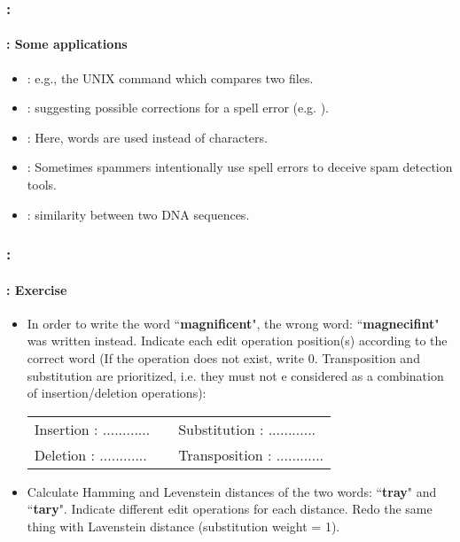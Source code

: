 \documentclass[xcolor=table]{beamer}
\begin{document}
\begin{frame}
	\frametitle{\insertshortsubtitle: \insertsection}
	\framesubtitle{\insertsubsection: Some applications}

	\begin{itemize}
		\item {}: e.g., the UNIX  command which compares two files.
		\item {}: suggesting possible corrections for a spell error (e.g. ).
		\item {}: Here, words are used instead of characters.
		\item {}: Sometimes spammers intentionally use spell errors to deceive spam detection tools.
		\item {}: similarity between two DNA sequences.
	\end{itemize}

\end{frame}

\begin{frame}
	\frametitle{\insertshortsubtitle: \insertsection}
	\framesubtitle{\insertsubsection: Exercise}
	
	\begin{itemize}
		\item In order to write the word ``\textbf{magnificent}", the wrong word: ``\textbf{magnecifint}" was written instead. Indicate each edit operation position(s) according to the correct word (If the operation does not exist, write 0. Transposition and substitution are prioritized, i.e. they must not e considered as a combination of insertion/deletion operations):
		\begin{tabular}{|lll|}
			\hline 
			Insertion : ............ & & Substitution  : ............ \\
			Deletion  : ............ & & Transposition : ............ \\
			\hline
		\end{tabular}
		
		\item Calculate Hamming and Levenstein distances of the two words: ``\textbf{tray}" and ``\textbf{tary}".
		Indicate different edit operations for each distance. Redo the same thing with Lavenstein distance (substitution weight = 1).
	\end{itemize}
	
\end{frame}
\end{document}
